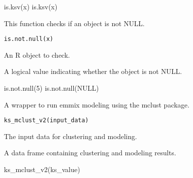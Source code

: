 \documentclass[a4paper]{book}
\begin{document}
%
\begin{Examples}
\begin{ExampleCode}
is.ksv(x)
is.ksv(x)
\end{ExampleCode}
\end{Examples}
%
\begin{Description}\relax
This function checks if an object is not NULL.
\end{Description}
%
\begin{Usage}
\begin{verbatim}
is.not.null(x)
\end{verbatim}
\end{Usage}
%
\begin{Arguments}
\begin{ldescription}
\item[\code{x}] An R object to check.
\end{ldescription}
\end{Arguments}
%
\begin{Value}
A logical value indicating whether the object is not NULL.
\end{Value}
%
\begin{Examples}
\begin{ExampleCode}
is.not.null(5)
is.not.null(NULL)
\end{ExampleCode}
\end{Examples}
%
\begin{Description}\relax
A wrapper to run emmix modeling using the mclust package.
\end{Description}
%
\begin{Usage}
\begin{verbatim}
ks_mclust_v2(input_data)
\end{verbatim}
\end{Usage}
%
\begin{Arguments}
\begin{ldescription}
\item[\code{input\_data}] The input data for clustering and modeling.
\end{ldescription}
\end{Arguments}
%
\begin{Value}
A data frame containing clustering and modeling results.
\end{Value}
%
\begin{Examples}
\begin{ExampleCode}
ks_mclust_v2(ks_value)
\end{ExampleCode}
\end{Examples}
\end{document}
